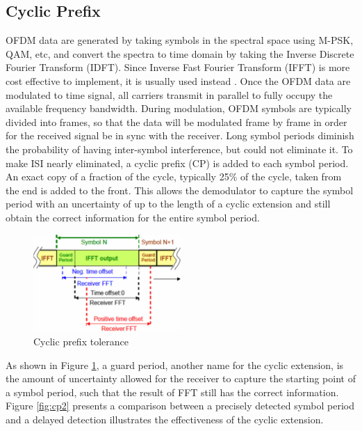 \subsection{Cyclic Prefix}
OFDM data are generated by taking symbols in the spectral space using M-PSK, QAM, etc, and convert the spectra to time domain by taking the Inverse Discrete Fourier Transform (IDFT). Since Inverse Fast Fourier Transform (IFFT) is more cost effective to implement, it is usually used instead \cite{b3}. Once the OFDM data are modulated to time signal, all carriers transmit in parallel to fully occupy the available frequency bandwidth. During modulation, OFDM symbols are typically divided into frames, so that the data will be modulated frame by frame in order for the received signal be in sync with the receiver. Long symbol periods diminish the probability of having inter-symbol interference, but could not eliminate it. To make ISI nearly eliminated, a cyclic prefix (CP) is added to each symbol period. An exact copy of a fraction of the cycle, typically 25\% of the cycle, taken from the end is added to the front. This allows the demodulator to capture the symbol period with an uncertainty of up to the length of a cyclic extension and still obtain the correct information for the entire symbol period.

\begin{figure}[ht]
    \centering
    \includegraphics[width=0.5\textwidth]{Figures/Cyclic-extension-tolerance}
    \caption{Cyclic prefix tolerance}
    \label{fig:cp1}
\end{figure}

As shown in Figure \ref{fig:cp1}, a guard period, another name for the cyclic extension, is the amount of uncertainty allowed for the receiver to capture the starting point of a symbol period, such that the result of FFT still has the correct information. Figure \ref{fig:cp2} presents a comparison between a precisely detected symbol period and a delayed detection illustrates the effectiveness of the cyclic extension.

